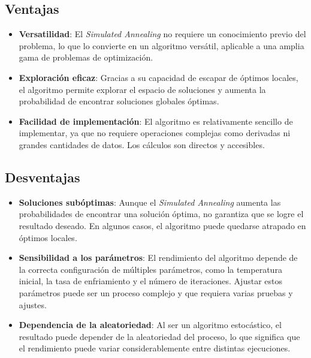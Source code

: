 \documentclass[12pt,twoside]{article}
\begin{document}
	\subsection{Ventajas}
	
	\begin{itemize}
		\item \textbf{Versatilidad}: El \textit{Simulated Annealing} no requiere un conocimiento previo del problema, lo que lo convierte en un algoritmo versátil, aplicable a una amplia gama de problemas de optimización.
		
		\item \textbf{Exploración eficaz}: Gracias a su capacidad de escapar de óptimos locales, el algoritmo permite explorar el espacio de soluciones y aumenta la probabilidad de encontrar soluciones globales óptimas.
		
		\item \textbf{Facilidad de implementación}: El algoritmo es relativamente sencillo de implementar, ya que no requiere operaciones complejas como derivadas ni grandes cantidades de datos. Los cálculos son directos y accesibles.
	\end{itemize}
	
	\subsection{Desventajas}
	
	\begin{itemize}
		\item \textbf{Soluciones subóptimas}: Aunque el \textit{Simulated Annealing} aumenta las probabilidades de encontrar una solución óptima, no garantiza que se logre el resultado deseado. En algunos casos, el algoritmo puede quedarse atrapado en óptimos locales.
		
		\item \textbf{Sensibilidad a los parámetros}: El rendimiento del algoritmo depende de la correcta configuración de múltiples parámetros, como la temperatura inicial, la tasa de enfriamiento y el número de iteraciones. Ajustar estos parámetros puede ser un proceso complejo y que requiera varias pruebas y ajustes.
		
		\item \textbf{Dependencia de la aleatoriedad}: Al ser un algoritmo estocástico, el resultado puede depender de la aleatoriedad del proceso, lo que significa que el rendimiento puede variar considerablemente entre distintas ejecuciones.
	\end{itemize}
	
\end{document}
